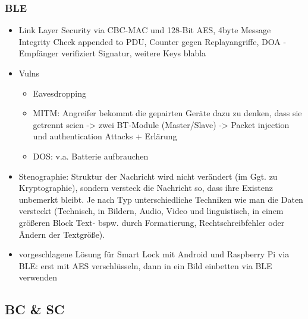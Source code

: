     \subsubsection{BLE}
        \begin{itemize}
            \item Link Layer Security via CBC-MAC und 128-Bit AES, 4byte Message Integrity Check appended to PDU, Counter gegen Replayangriffe, DOA - Empfänger verifiziert Signatur, weitere Keys blabla
            \item Vulns
                \begin{itemize}
                    \item Eavesdropping
                    \item MITM: Angreifer bekommt die gepairten Geräte dazu zu denken, dass sie getrennt seien -> zwei BT-Module (Master/Slave) -> Packet injection und authentication Attacks + Erlärung
                    \item DOS: v.a. Batterie aufbrauchen
                \end{itemize}
            \item Stenographie: Struktur der Nachricht wird nicht verändert (im Ggt. zu Kryptographie), sondern versteck die Nachricht so, dass ihre Existenz unbemerkt bleibt. Je nach Typ unterschiedliche Techniken wie man die Daten versteckt (Technisch, in Bildern, Audio, Video und linguistisch, in einem größeren Block Text- bspw. durch Formatierung, Rechtschreibfehler oder Ändern der Textgröße).
            \item vorgeschlagene Lösung für Smart Lock mit Android und Raspberry Pi via BLE: erst mit AES verschlüsseln, dann in ein Bild einbetten via BLE verwenden
        \end{itemize}

\subsection{BC \& SC}\cite{Christidis2016} 
